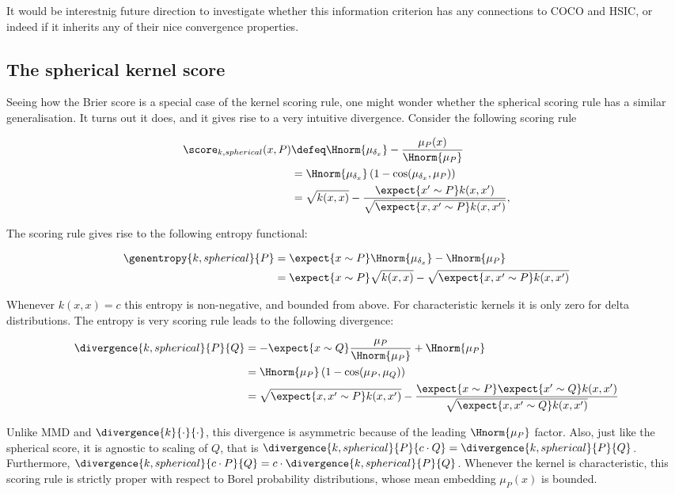 It would be interestnig future direction to investigate whether this information criterion has any connections to COCO and HSIC, or indeed if it inherits any of their nice convergence properties.

\subsection{The spherical kernel score}

Seeing how the Brier score is a special case of the kernel scoring rule, one might wonder whether the spherical scoring rule has a similar generalisation. It turns out it does, and it gives rise to a very intuitive divergence. Consider the following scoring rule

\begin{align}
	\score_{k,spherical}(x,P) &\defeq \Hnorm{\mu_{\delta_x}} - \frac{\mu_P(x)}{\Hnorm{\mu_P}}\\
			& = \Hnorm{\mu_{\delta_x}}\left(1 - \cos(\mu_{\delta_x},\mu_{P})\right)\\
		& =\sqrt{k(x,x)} - \frac{\expect{x'\sim P}k(x,x')}{\sqrt{\expect{x,x'\sim P}k(x,x')}},
\end{align}

The scoring rule gives rise to the following entropy functional:

\begin{align}
	\genentropy{k,spherical}{P} & = \expect{x\sim P}\Hnorm{\mu_{\delta_x}} - \Hnorm{\mu_P}\\
		& = \expect{x\sim P}\sqrt{k(x,x)} - \sqrt{\expect{x,x'\sim P}k(x,x')}
\end{align}

Whenever $k(x,x)=c$ this entropy is non-negative, and bounded from above. For characteristic kernels it is only zero for delta distributions. The entropy is very scoring rule leads to the following divergence:

\begin{align}
	\divergence{k,spherical}{P}{Q} &= - \expect{x\sim Q}\frac{\mu_P}{\Hnorm{\mu_P}} + \Hnorm{\mu_P}\\
		&= \Hnorm{\mu_P} \left( 1 - \cos(\mu_P, \mu_Q)\right)\\
		&= \sqrt{\expect{x,x'\sim P}k(x,x')} - \frac{\expect{x\sim P}\expect{x'\sim Q}k(x,x')}{\sqrt{\expect{x,x'\sim Q}k(x,x')}} \label{eqn:spherical_kernel_divergence}
\end{align}

Unlike MMD and $\divergence{k}{\cdot}{\cdot}$, this divergence is asymmetric because of the leading $\Hnorm{\mu_P}$ factor. Also, just like the spherical score, it is agnostic to scaling of $Q$, that is $\divergence{k,spherical}{P}{c\cdot Q} = \divergence{k,spherical}{P}{Q}$. Furthermore, $\divergence{k,spherical}{c\cdot P}{Q} = c \cdot \divergence{k,spherical}{P}{Q}$. Whenever the kernel is characteristic, this scoring rule is strictly proper with respect to Borel probability distributions, whose mean embedding $\mu_P(x)$ is bounded.

